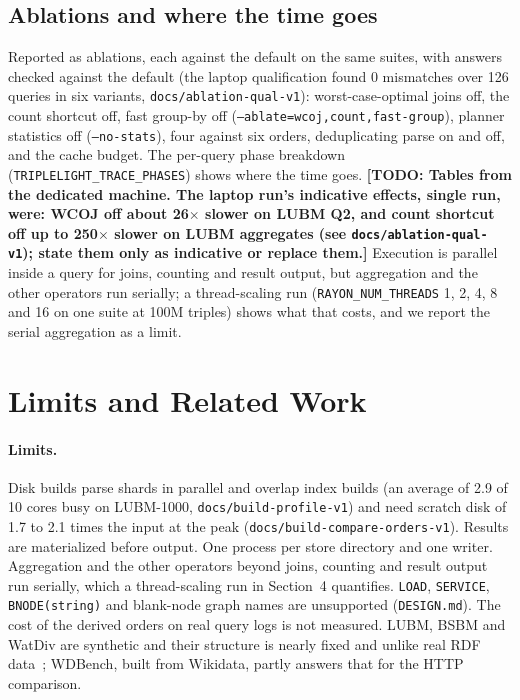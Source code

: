 \documentclass[sigconf, nonacm]{acmart}
\newcommand{\todo}[1]{\textbf{[TODO: #1]}}
\begin{document}
\subsection{Ablations and where the time goes}\label{sec:ablate}
Reported as ablations, each against the default on the same suites, with answers checked against the default (the laptop qualification found 0 mismatches over 126 queries in six variants, \texttt{docs/ablation-qual-v1}): worst-case-optimal joins off, the count shortcut off, fast group-by off (\texttt{--ablate=wcoj,count,fast-group}), planner statistics off (\texttt{--no-stats}), four against six orders, deduplicating parse on and off, and the cache budget. The per-query phase breakdown (\texttt{TRIPLELIGHT\_TRACE\_PHASES}) shows where the time goes. \todo{Tables from the dedicated machine. The laptop run's indicative effects, single run, were: WCOJ off about 26$\times$ slower on LUBM Q2, and count shortcut off up to 250$\times$ slower on LUBM aggregates (see \texttt{docs/ablation-qual-v1}); state them only as indicative or replace them.}
Execution is parallel inside a query for joins, counting and result output, but aggregation and the other operators run serially; a thread-scaling run (\texttt{RAYON\_NUM\_THREADS} 1, 2, 4, 8 and 16 on one suite at 100M triples) shows what that costs, and we report the serial aggregation as a limit.

\section{Limits and Related Work}
\paragraph{Limits.} Disk builds parse shards in parallel and overlap index builds (an average of 2.9 of 10 cores busy on LUBM-1000, \texttt{docs/build-profile-v1}) and need scratch disk of 1.7 to 2.1 times the input at the peak (\texttt{docs/build-compare-orders-v1}).
Results are materialized before output. One process per store directory and one writer. Aggregation and the other operators beyond joins, counting and result output run serially, which a thread-scaling run in Section~4 quantifies. \texttt{LOAD}, \texttt{SERVICE}, \texttt{BNODE(string)} and blank-node graph names are unsupported (\texttt{DESIGN.md}).
The cost of the derived orders on real query logs is not measured. LUBM, BSBM and WatDiv are synthetic and their structure is nearly fixed and unlike real RDF data~\cite{duan2011}; WDBench, built from Wikidata, partly answers that for the HTTP comparison.
\end{document}
